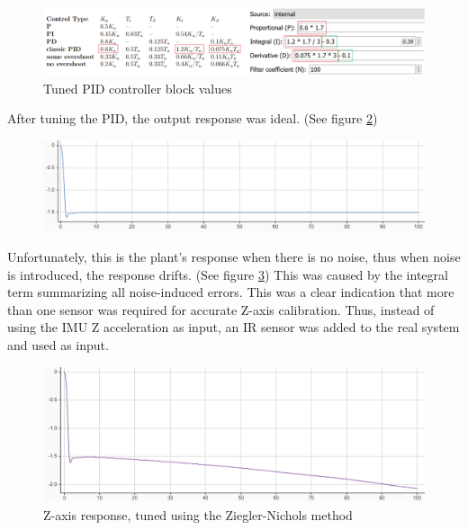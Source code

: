 \begin{figure}[H]
    \begin{center}
    \includegraphics[scale=0.65]{pictures/control/simpidvalues}
    \end{center}
    \caption{Tuned PID controller block values}
    \label{fig:simpidvalues}
\end{figure}

After tuning the PID, the output response was ideal. (See figure \ref{fig:zpidnonoise})

\begin{figure}[H]
    \begin{center}
    \includegraphics[scale=0.7]{pictures/control/zpidnonoise}
    \end{center}
    \caption{}
    \label{fig:zpidnonoise}
\end{figure}

Unfortunately, this is the plant's response when there is no noise, thus when noise is introduced, the response drifts. (See figure \ref{fig:zpidnoise})
This was caused by the integral term summarizing all noise-induced errors. This was a clear indication that more than one sensor was required for accurate Z-axis calibration.
Thus, instead of using the IMU Z acceleration as input, an IR sensor was added to the real system and used as input.

\begin{figure}[H]
    \begin{center}
    \includegraphics[scale=0.7]{pictures/control/zpidnoise}
    \end{center}
    \caption{Z-axis response, tuned using the Ziegler-Nichols method}
    \label{fig:zpidnoise}
\end{figure}
